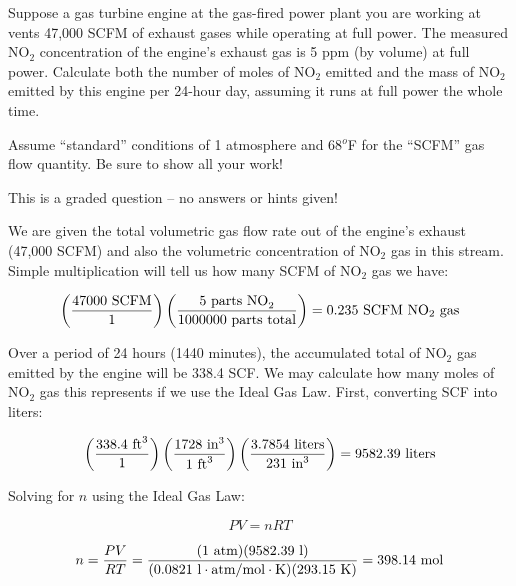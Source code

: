 

Suppose a gas turbine engine at the gas-fired power plant you are working at vents 47,000 SCFM of exhaust gases while operating at full power.  The measured NO$_{2}$ concentration of the engine's exhaust gas is 5 ppm (by volume) at full power.  Calculate both the number of moles of NO$_{2}$ emitted and the mass of NO$_{2}$ emitted by this engine per 24-hour day, assuming it runs at full power the whole time.

Assume ``standard'' conditions of 1 atmosphere and 68$^{o}$F for the ``SCFM'' gas flow quantity.  Be sure to show all your work!


\vfil

\eject






This is a graded question -- no answers or hints given!







We are given the total volumetric gas flow rate out of the engine's exhaust (47,000 SCFM) and also the volumetric concentration of NO$_{2}$ gas in this stream.  Simple multiplication will tell us how many SCFM of NO$_{2}$ gas we have:

$$\left( {47000 \hbox{ SCFM} \over 1} \right) \left( {5 \hbox{ parts NO}_2 \over 1000000 \hbox{ parts total}} \right) = 0.235 \hbox{ SCFM NO}_2 \hbox{ gas}$$

Over a period of 24 hours (1440 minutes), the accumulated total of NO$_{2}$ gas emitted by the engine will be 338.4 SCF.  We may calculate how many moles of NO$_{2}$ gas this represents if we use the Ideal Gas Law.  First, converting SCF into liters:

$$\left( {338.4 \hbox{ ft}^3 \over 1} \right) \left( {1728 \hbox{ in}^3 \over 1 \hbox{ ft}^3 } \right) \left( {3.7854 \hbox{ liters} \over 231 \hbox{ in}^3} \right) = 9582.39 \hbox{ liters}$$

Solving for $n$ using the Ideal Gas Law:

$$PV = nRT$$

$$n = {PV \over RT} = {(1 \hbox{ atm})(9582.39 \hbox{ l}) \over (0.0821 \hbox{ l}\cdot\hbox{atm/mol}\cdot\hbox{K})(293.15 \hbox{ K})} = 398.14 \hbox{ mol}$$

